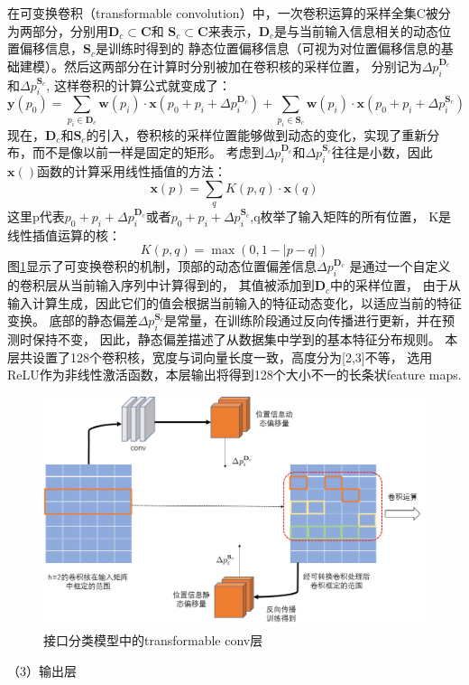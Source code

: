 在可变换卷积（transformable convolution）中，一次卷积运算的采样全集C被分为两部分，分别用$\mathbf{D}_{c} \subset \mathbf{C}$和
$\mathbf{S}_{c} \subset \mathbf{C}$来表示，$\mathbf{D}_{c}$是与当前输入信息相关的动态位置偏移信息，$\mathbf{S}_{c}$是训练时得到的
静态位置偏移信息（可视为对位置偏移信息的基础建模）。然后这两部分在计算时分别被加在卷积核的采样位置，
分别记为$\Delta p_{i}^{\mathbf{D}_{c}}$和$\Delta p_{i}^{\mathbf{S}_{c}}$,
这样卷积的计算公式就变成了：
\begin{equation}
  \mathbf{y}\left(p_{0}\right)= \sum_{p_{i} \in \mathbf{D}_{c}} \mathbf{w}\left(p_{i}\right) \cdot \mathbf{x}\left(p_{0}+p_{i}+\Delta p_{i}^{\mathbf{D}_{c}}\right) +\sum_{p_{i} \in \mathbf{S}_{c}} \mathbf{w}\left(p_{i}\right) \cdot \mathbf{x}\left(p_{0}+p_{i}+\Delta p_{i}^{\mathbf{S}_{c}}\right)
\end{equation}
现在，$\mathbf{D}_{c}$和$\mathbf{S}_{c}$的引入，卷积核的采样位置能够做到动态的变化，实现了重新分布，而不是像以前一样是固定的矩形。
考虑到$\Delta p_{i}^{\mathbf{D}_{c}}$和$\Delta p_{i}^{\mathbf{S}_{c}}$往往是小数，因此$\mathbf{x}()$函数的计算采用线性插值的方法：
\begin{equation}
\mathbf{x}(p)=\sum_{q} K(p, q) \cdot \mathbf{x}(q)
\end{equation}
这里p代表$p_{0}+p_{i}+\Delta p_{i}^{\mathbf{D}_{c}}$或者$p_{0}+p_{i}+\Delta p_{i}^{\mathbf{S}_{c}}$,q枚举了输入矩阵的所有位置，
K是线性插值运算的核：
\begin{equation}
K(p, q)=\max (0,1-|p-q|)
\end{equation}
图\ref{fig:tansconv}显示了可变换卷积的机制，顶部的动态位置偏差信息$\Delta p_{i}^{\mathbf{D}_{c}}$
是通过一个自定义的卷积层从当前输入序列中计算得到的，
其值被添加到$\mathbf{D}_{c}$中的采样位置，
由于从输入计算生成，因此它们的值会根据当前输入的特征动态变化，以适应当前的特征变换。 
底部的静态偏差$\Delta p_{i}^{\mathbf{S}_{c}}$是常量，在训练阶段通过反向传播进行更新，并在预测时保持不变，
因此，静态偏差描述了从数据集中学到的基本特征分布规则。
本层共设置了128个卷积核，宽度与词向量长度一致，高度分为[2,3]不等，
选用ReLU作为非线性激活函数，本层输出将得到128个大小不一的长条状feature maps.

\begin{figure}[htbp]
  \centering
  \includegraphics[scale=0.4]{./images/tansconv.jpg}
  \caption{接口分类模型中的transformable conv层}
  \label{fig:tansconv}
\end{figure}
（3）输出层

